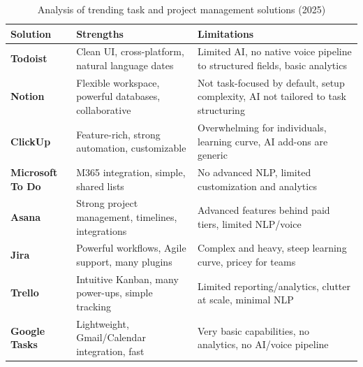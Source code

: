 \documentclass[12pt,a4paper]{article}
\begin{document}
\begin{table}[H]
\centering
\small
\begin{tabular}{|p{}|p{}|p{}|}
\hline
\textbf{Solution} & \textbf{Strengths} & \textbf{Limitations} \\
\hline
\textbf{Todoist} & Clean UI, cross-platform, natural language dates & Limited AI, no native voice pipeline to structured fields, basic analytics \\
\hline
\textbf{Notion} & Flexible workspace, powerful databases, collaborative & Not task-focused by default, setup complexity, AI not tailored to task structuring \\
\hline
\textbf{ClickUp} & Feature-rich, strong automation, customizable & Overwhelming for individuals, learning curve, AI add-ons are generic \\
\hline
\textbf{Microsoft To Do} & M365 integration, simple, shared lists & No advanced NLP, limited customization and analytics \\
\hline
\textbf{Asana} & Strong project management, timelines, integrations & Advanced features behind paid tiers, limited NLP/voice \\
\hline
\textbf{Jira} & Powerful workflows, Agile support, many plugins & Complex and heavy, steep learning curve, pricey for teams \\
\hline
\textbf{Trello} & Intuitive Kanban, many power-ups, simple tracking & Limited reporting/analytics, clutter at scale, minimal NLP \\
\hline
\textbf{Google Tasks} & Lightweight, Gmail/Calendar integration, fast & Very basic capabilities, no analytics, no AI/voice pipeline \\
\hline
\end{tabular}
\caption{Analysis of trending task and project management solutions (2025)}
\end{table}
\end{document}
